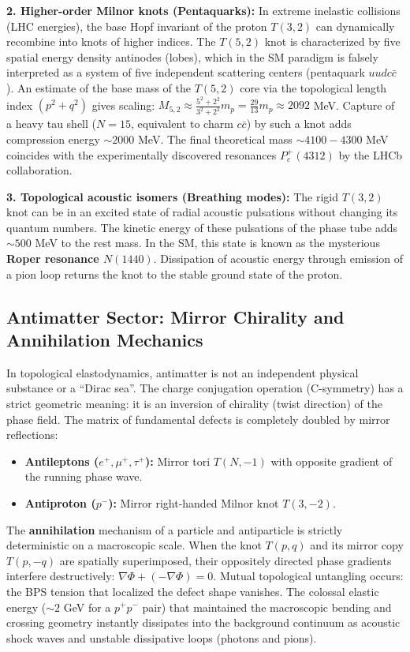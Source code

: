 \documentclass[11pt,a4paper]{article}
\begin{document}
\textbf{2. Higher-order Milnor knots (Pentaquarks):}
In extreme inelastic collisions (LHC energies), the base Hopf invariant of the proton $T(3,2)$ can dynamically recombine into knots of higher indices. The $T(5,2)$ knot is characterized by five spatial energy density antinodes (lobes), which in the SM paradigm is falsely interpreted as a system of five independent scattering centers (pentaquark $uudc\bar{c}$).
An estimate of the base mass of the $T(5,2)$ core via the topological length index $(p^2+q^2)$ gives scaling: $M_{5,2} \approx \frac{5^2+2^2}{3^2+2^2} m_p = \frac{29}{13} m_p \approx 2092$ MeV. Capture of a heavy tau shell ($N=15$, equivalent to charm $c\bar{c}$) by such a knot adds compression energy $\sim 2000$ MeV. The final theoretical mass $\sim 4100-4300$ MeV coincides with the experimentally discovered resonances $P_c^+(4312)$ by the LHCb collaboration.

\textbf{3. Topological acoustic isomers (Breathing modes):}
The rigid $T(3,2)$ knot can be in an excited state of radial acoustic pulsations without changing its quantum numbers. The kinetic energy of these pulsations of the phase tube adds $\sim 500$ MeV to the rest mass. In the SM, this state is known as the mysterious \textbf{Roper resonance $N(1440)$}. Dissipation of acoustic energy through emission of a pion loop returns the knot to the stable ground state of the proton.

\subsection{Antimatter Sector: Mirror Chirality and Annihilation Mechanics}
In topological elastodynamics, antimatter is not an independent physical substance or a ``Dirac sea''. The charge conjugation operation (C-symmetry) has a strict geometric meaning: it is an inversion of chirality (twist direction) of the phase field. The matrix of fundamental defects is completely doubled by mirror reflections:
\begin{itemize}
\item \textbf{Antileptons ($e^+, \mu^+, \tau^+$):} Mirror tori $T(N, -1)$ with opposite gradient of the running phase wave.
\item \textbf{Antiproton ($p^-$):} Mirror right-handed Milnor knot $T(3, -2)$.
\end{itemize}

The \textbf{annihilation} mechanism of a particle and antiparticle is strictly deterministic on a macroscopic scale. When the knot $T(p,q)$ and its mirror copy $T(p,-q)$ are spatially superimposed, their oppositely directed phase gradients interfere destructively: $\nabla \Phi + (-\nabla \Phi) = 0$. Mutual topological untangling occurs: the BPS tension that localized the defect shape vanishes. The colossal elastic energy ($\sim 2$ GeV for a $p^+p^-$ pair) that maintained the macroscopic bending and crossing geometry instantly dissipates into the background continuum as acoustic shock waves and unstable dissipative loops (photons and pions).
\end{document}
